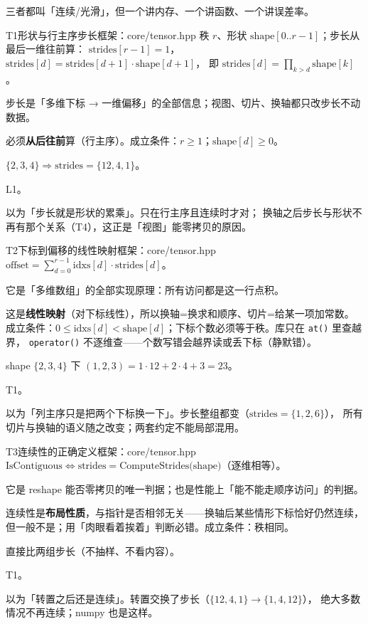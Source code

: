 三者都叫「连续/光滑」，但一个讲内存、一个讲函数、一个讲误差率。

\begin{know}{T1}{形状与行主序步长}{框架：core/tensor.hpp}
 秩 $r$、形状 $\text{shape}[0..r-1]$；步长从最后一维往前算：
$\text{strides}[r-1]=1$，$\text{strides}[d]=\text{strides}[d+1]\cdot\text{shape}[d+1]$，
即 $\text{strides}[d]=\prod_{k>d}\text{shape}[k]$。

 步长是「多维下标 → 一维偏移」的全部信息；视图、切片、换轴都只改步长不动数据。

 必须\textbf{从后往前}算（行主序）。成立条件：$r\ge1$；$\text{shape}[d]\ge0$。

 $\{2,3,4\}\Rightarrow\text{strides}=\{12,4,1\}$。

 L1。

 以为「步长就是形状的累乘」。只在行主序且连续时才对；
换轴之后步长与形状不再有那个关系（T4），这正是「视图」能零拷贝的原因。
\end{know}

\begin{know}{T2}{下标到偏移的线性映射}{框架：core/tensor.hpp}
 $\text{offset}=\sum_{d=0}^{r-1}\text{idxs}[d]\cdot\text{strides}[d]$。

 它是「多维数组」的全部实现原理：所有访问都是这一行点积。

 这是\textbf{线性映射}（对下标线性），所以换轴=换求和顺序、切片=给某一项加常数。
成立条件：$0\le\text{idxs}[d]<\text{shape}[d]$；下标个数必须等于秩。库只在 \texttt{at()} 里查越界，
\texttt{operator()} 不逐维查——个数写错会越界读或丢下标（静默错）。

 shape $\{2,3,4\}$ 下 $(1,2,3)=1\cdot12+2\cdot4+3=23$。

 T1。

 以为「列主序只是把两个下标换一下」。步长整组都变（$\text{strides}=\{1,2,6\}$），
所有切片与换轴的语义随之改变；两套约定不能局部混用。
\end{know}

\begin{know}{T3}{连续性的正确定义}{框架：core/tensor.hpp}
 $\text{IsContiguous}\iff\text{strides}=\text{ComputeStrides(shape)}$（逐维相等）。

 它是 reshape 能否零拷贝的唯一判据；也是性能上「能不能走顺序访问」的判据。

 连续性是\textbf{布局性质}，与指针是否相邻无关——换轴后某些情形下标恰好仍然连续，
但一般不是；用「肉眼看着挨着」判断必错。成立条件：秩相同。

 直接比两组步长（不抽样、不看内容）。

 T1。

 以为「转置之后还是连续」。转置交换了步长（$\{12,4,1\}\to\{1,4,12\}$），
绝大多数情况不再连续；numpy 也是这样。
\end{know}

